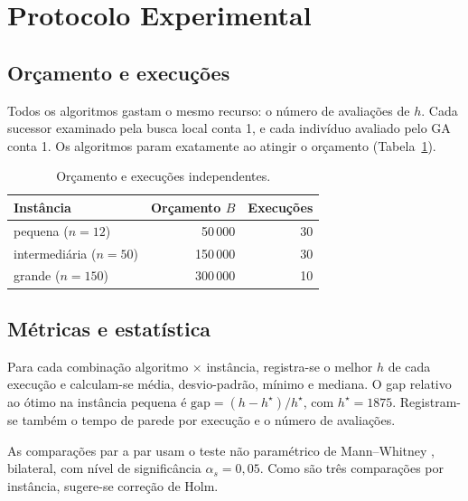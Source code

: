 \section{Protocolo Experimental}\label{sec:protocolo}

\subsection{Orçamento e execuções}

Todos os algoritmos gastam o mesmo recurso: o número de avaliações de $h$. Cada sucessor examinado pela busca local conta 1, e cada indivíduo avaliado pelo GA conta 1. Os algoritmos param exatamente ao atingir o orçamento (Tabela~\ref{tab:orcamento}).

\begin{table}[H]
\centering
\caption{Orçamento e execuções independentes.}
\label{tab:orcamento}
\small
\begin{tabular}{lrr}
\toprule
Instância & Orçamento $B$ & Execuções\\
\midrule
pequena ($n=12$) & 50\,000 & 30\\
intermediária ($n=50$) & 150\,000 & 30\\
grande ($n=150$) & 300\,000 & 10\\
\bottomrule
\end{tabular}
\end{table}

\subsection{Métricas e estatística}

Para cada combinação algoritmo $\times$ instância, registra-se o melhor $h$ de cada execução e calculam-se média, desvio-padrão, mínimo e mediana. O gap relativo ao ótimo na instância pequena é $\text{gap}=(h-h^\star)/h^\star$, com $h^\star=1875$. Registram-se também o tempo de parede por execução e o número de avaliações.

As comparações par a par usam o teste não paramétrico de Mann--Whitney \cite{mann1947}, bilateral, com nível de significância $\alpha_s=0{,}05$. Como são três comparações por instância, sugere-se correção de Holm.


